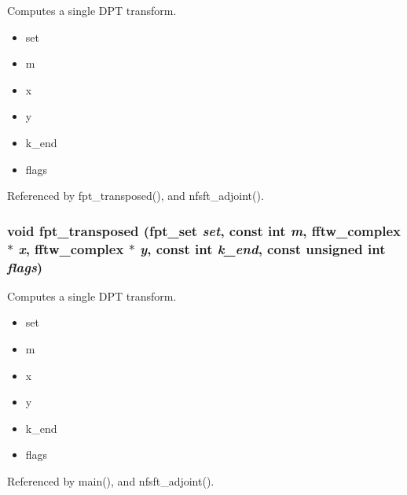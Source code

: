 Computes a single DPT transform. 

\begin{itemize}
\item set \item m \item x \item y \item k\_\-end \item flags \end{itemize}


Referenced by fpt\_\-transposed(), and nfsft\_\-adjoint().\hypertarget{group__fpt_gbacb4c41365ca6f32b72688376aa86e1}{
\subsubsection{\setlength{\rightskip}{0pt plus 5cm}void fpt\_\-transposed ({\bf fpt\_\-set} {\em set}, const int {\em m}, fftw\_\-complex $\ast$ {\em x}, fftw\_\-complex $\ast$ {\em y}, const int {\em k\_\-end}, const unsigned int {\em flags})}}
\label{group__fpt_gbacb4c41365ca6f32b72688376aa86e1}


Computes a single DPT transform. 

\begin{itemize}
\item set \item m \item x \item y \item k\_\-end \item flags \end{itemize}


Referenced by main(), and nfsft\_\-adjoint().